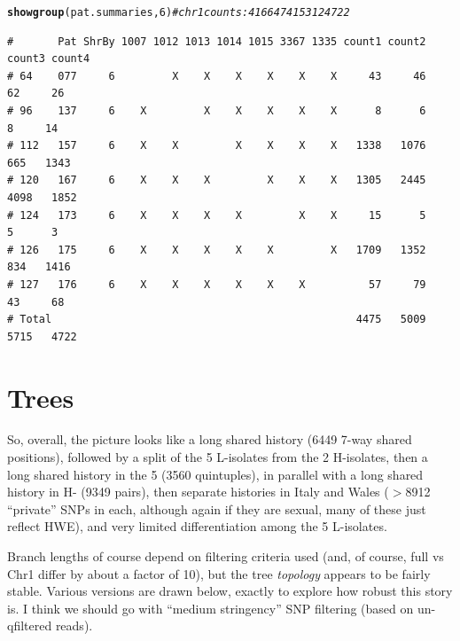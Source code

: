 \documentclass{article}\usepackage[]{graphicx}\usepackage[]{color}
\makeatletter
\newcommand{\hlnum}[1]{\textcolor[rgb]{0.686,0.059,0.569}{#1}}%
\newcommand{\hlcom}[1]{\textcolor[rgb]{0.678,0.584,0.686}{\textit{#1}}}%
\newcommand{\hlstd}[1]{\textcolor[rgb]{0.345,0.345,0.345}{#1}}%
\newcommand{\hlkwd}[1]{\textcolor[rgb]{0.737,0.353,0.396}{\textbf{#1}}}%
\newenvironment{kframe}{%
 \def\at@end@of@kframe{}%
 \ifinner\ifhmode%
  \def\at@end@of@kframe{\end{minipage}}%
  \begin{minipage}{\columnwidth}%
 \fi\fi%
 \def\FrameCommand##1{\hskip\@totalleftmargin \hskip-\fboxsep
 \colorbox{shadecolor}{##1}\hskip-\fboxsep
     \hskip-\linewidth \hskip-\@totalleftmargin \hskip\columnwidth}%
 \MakeFramed {\advance\hsize-\width
   \@totalleftmargin\z@ \linewidth\hsize
   \@setminipage}}%
 {\par\unskip\endMakeFramed%
 \at@end@of@kframe}
\newenvironment{knitrout}{}{} %
\makeatother
\begin{document}
\begin{knitrout}\footnotesize
{}\color{fgcolor}\begin{kframe}
\begin{alltt}
\hlkwd{showgroup}\hlstd{(pat.summaries,}\hlnum{6}\hlstd{)} \hlcom{# chr 1 counts:  4166   4741   5312  4722}
\end{alltt}
\begin{verbatim}
#       Pat ShrBy 1007 1012 1013 1014 1015 3367 1335 count1 count2 count3 count4
# 64    077     6         X    X    X    X    X    X     43     46     62     26
# 96    137     6    X         X    X    X    X    X      8      6      8     14
# 112   157     6    X    X         X    X    X    X   1338   1076    665   1343
# 120   167     6    X    X    X         X    X    X   1305   2445   4098   1852
# 124   173     6    X    X    X    X         X    X     15      5      5      3
# 126   175     6    X    X    X    X    X         X   1709   1352    834   1416
# 127   176     6    X    X    X    X    X    X          57     79     43     68
# Total                                                4475   5009   5715   4722
\end{verbatim}
\end{kframe}
\end{knitrout}

\section{Trees}
So, overall, the picture looks like a long shared history
  (6449 7-way shared positions),
followed by a split of the 5 L-isolates from the 2 H-isolates, then a long shared history in the 5
  (3560 quintuples),
in parallel with a long shared history in H-
  (9349 pairs),
then separate histories in Italy and Wales
  ($>$8912 
  ``private'' SNPs in each, although again if they are sexual, many of these just reflect HWE),
and very limited differentiation among the 5 L-isolates.  

Branch lengths of course depend on filtering criteria used (and, of course, full vs Chr1 differ by 
about a factor of 10), but the tree \emph{topology} appears to be fairly stable.  Various versions 
are drawn below, exactly to explore how robust this story is.  I think we should go with ``medium 
stringency'' SNP filtering (based on un-qfiltered reads).
\end{document}

